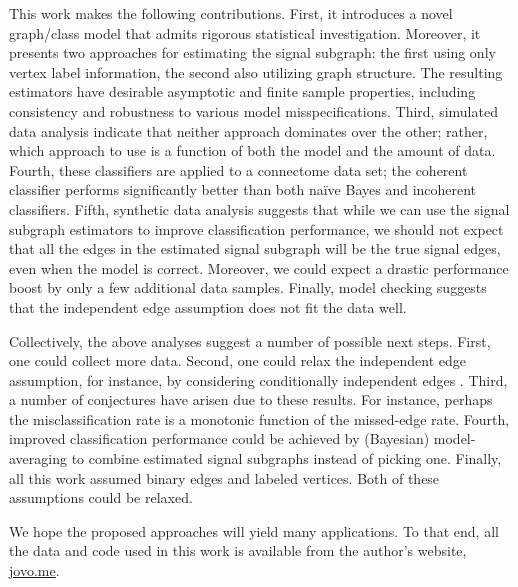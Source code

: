 \documentclass[10pt,journal,cspaper,compsoc]{IEEEtran}
\begin{document}
This work makes the following contributions. First, it introduces a novel graph/class model that admits rigorous statistical investigation.  Moreover, it presents two approaches for estimating the signal subgraph: the first using only vertex label information, the second also utilizing graph structure.  The resulting estimators have desirable asymptotic and finite sample properties, including consistency and robustness to various model misspecifications.  Third, simulated data analysis indicate that neither approach dominates over the other; rather, which approach to use is a function of both the model and the amount of data.  Fourth, these classifiers are applied to a connectome data set; the coherent classifier  performs significantly better than both na\"ive Bayes and incoherent classifiers.  Fifth, synthetic data analysis suggests that while we can use the signal subgraph estimators to improve classification performance, we should not expect that all the edges in the estimated signal subgraph will be the true signal edges, even when the model is correct. Moreover, we could expect a drastic performance boost by only a few additional data samples.  Finally, model checking suggests that the independent edge assumption does not fit the data well.  

Collectively, the above analyses suggest a number of possible next steps.  First, one could collect more data.  Second, one could relax the independent edge assumption, for instance, by considering conditionally independent edges \cite{Hoff02}.  Third, a number of conjectures have arisen due to these results.   For instance, perhaps the misclassification rate is a monotonic function of the missed-edge rate.  Fourth, improved classification performance could be achieved by (Bayesian) model-averaging to combine estimated signal subgraphs instead of picking one.  Finally, all this work assumed binary edges and labeled vertices.  Both of these assumptions could be relaxed. 

We hope the proposed approaches will yield many applications.  To that end, all the data and code used in this work is available from the author's website, \url{jovo.me}.  

% 
% 
% 
\end{document}
